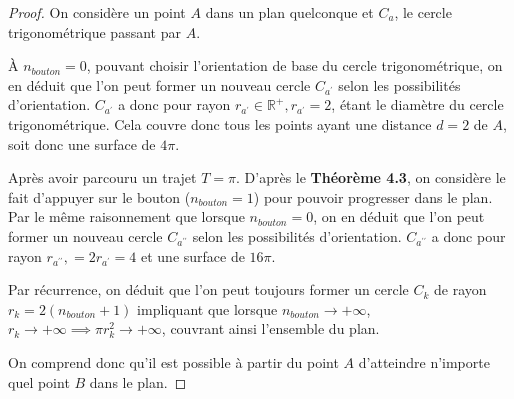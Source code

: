 \documentclass{amsart}
\theoremstyle{definition}
\theoremstyle{remark}
\numberwithin{equation}{section}
\begin{document}
\begin{proof}
  On considère un point $A$ dans un plan quelconque et $C_a$, le cercle trigonométrique passant par $A$.

  À $n_{bouton}=0$, pouvant choisir l'orientation de base du cercle trigonométrique, on en déduit que l'on peut former un nouveau cercle $C_{a^\prime}$ selon les possibilités d'orientation.  $C_{a^\prime}$ a donc pour rayon $r_{a^\prime}\in\mathbb{R^+}, r_{a^\prime}=2$, étant le 
  diamètre du cercle trigonométrique. Cela couvre donc tous les points ayant une distance $d=2$ de $A$, soit donc une surface de $4\pi$.

  Après avoir parcouru un trajet $T=\pi$. D'après le \textbf{Théorème 4.3}, on considère le fait d'appuyer sur le bouton ($n_{bouton}=1$) pour pouvoir progresser dans le plan. Par le même raisonnement que lorsque $n_{bouton}=0$,
  on en déduit que l'on peut former un nouveau cercle $C_{a^{\prime\prime}}$ selon les possibilités d'orientation.  $C_{a^{\prime\prime}}$ a donc pour rayon $r_{a^{\prime\prime}},=2r_{a^\prime}=4$ et une surface de $16\pi$.

  Par récurrence, on déduit que l'on peut toujours former un cercle $C_k$ de rayon $r_k=2(n_{bouton}+1)$ impliquant que lorsque $n_{bouton}\to+\infty$, $r_k\to+\infty \implies {\pi}r_k^2\to+\infty$, couvrant ainsi l'ensemble du plan.

  On comprend donc qu'il est possible à partir du point $A$ d'atteindre n'importe quel point $B$ dans le plan.



\end{proof}
\end{document}
